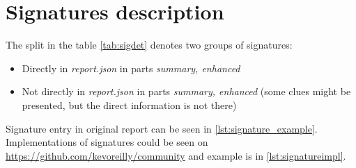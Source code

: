 \chapter{Signatures description} \label{app:signatures}
The split in the table \ref{tab:sigdet} denotes two groups of signatures:
\begin{itemize}
  \item Directly in \emph{report.json} in parts \emph{summary, enhanced}
  \item Not directly in \emph{report.json} in parts \emph{summary, enhanced} (some clues might be presented, but the direct information is not there)
\end{itemize}
Signature entry in original report can be seen in \ref{lst:signature_example}. Implementations of signatures could be seen on \url{https://github.com/kevoreilly/community} and example is in \ref{lst:signatureimpl}.

\newpage

